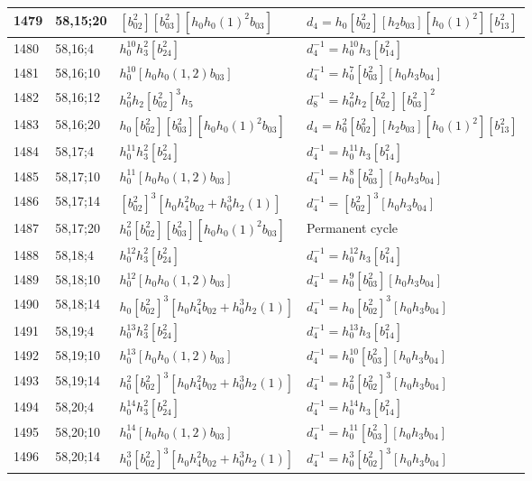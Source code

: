 \documentclass{article}
\begin{document}
\begin{longtable}{|l|l|>{\raggedright\arraybackslash}p{6cm}|>{\raggedright\arraybackslash}p{6cm}|}
\hline
1479 & 58,15;20 & $[b_{02}^2][b_{03}^2][h_0h_0(1)^2b_{03}]$ &$d_{4}=h_0[b_{02}^2][h_2b_{03}][h_0(1)^2][b_{13}^2]$\\
\hline
1480 & 58,16;4 & $h_0^{10}h_3^2[b_{24}^2]$ & $d_{4}^{-1}=h_0^{10}h_3[b_{14}^2]$\\
\hline
1481 & 58,16;10 & $h_0^{10}[h_0h_0(1, 2)b_{03}]$ & $d_{4}^{-1}=h_0^7[b_{03}^2][h_0h_3b_{04}]$\\
\hline
1482 & 58,16;12 & $h_0^2h_2[b_{02}^2]^3h_5$ & $d_{8}^{-1}=h_0^2h_2[b_{02}^2][b_{03}^2]^2$\\
\hline
1483 & 58,16;20 & $h_0[b_{02}^2][b_{03}^2][h_0h_0(1)^2b_{03}]$ &$d_{4}=h_0^2[b_{02}^2][h_2b_{03}][h_0(1)^2][b_{13}^2]$\\
\hline
1484 & 58,17;4 & $h_0^{11}h_3^2[b_{24}^2]$ & $d_{4}^{-1}=h_0^{11}h_3[b_{14}^2]$\\
\hline
1485 & 58,17;10 & $h_0^{11}[h_0h_0(1, 2)b_{03}]$ & $d_{4}^{-1}=h_0^8[b_{03}^2][h_0h_3b_{04}]$\\
\hline
1486 & 58,17;14 & $[b_{02}^2]^3[h_0h_4^2b_{02} + h_0^3h_2(1)]$ & $d_{4}^{-1}=[b_{02}^2]^3[h_0h_3b_{04}]$\\
\hline
1487 & 58,17;20 & $h_0^2[b_{02}^2][b_{03}^2][h_0h_0(1)^2b_{03}]$ & Permanent cycle\\
\hline
1488 & 58,18;4 & $h_0^{12}h_3^2[b_{24}^2]$ & $d_{4}^{-1}=h_0^{12}h_3[b_{14}^2]$\\
\hline
1489 & 58,18;10 & $h_0^{12}[h_0h_0(1, 2)b_{03}]$ & $d_{4}^{-1}=h_0^9[b_{03}^2][h_0h_3b_{04}]$\\
\hline
1490 & 58,18;14 & $h_0[b_{02}^2]^3[h_0h_4^2b_{02} + h_0^3h_2(1)]$ & $d_{4}^{-1}=h_0[b_{02}^2]^3[h_0h_3b_{04}]$\\
\hline
1491 & 58,19;4 & $h_0^{13}h_3^2[b_{24}^2]$ & $d_{4}^{-1}=h_0^{13}h_3[b_{14}^2]$\\
\hline
1492 & 58,19;10 & $h_0^{13}[h_0h_0(1, 2)b_{03}]$ & $d_{4}^{-1}=h_0^{10}[b_{03}^2][h_0h_3b_{04}]$\\
\hline
1493 & 58,19;14 & $h_0^2[b_{02}^2]^3[h_0h_4^2b_{02} + h_0^3h_2(1)]$ & $d_{4}^{-1}=h_0^2[b_{02}^2]^3[h_0h_3b_{04}]$\\
\hline
1494 & 58,20;4 & $h_0^{14}h_3^2[b_{24}^2]$ & $d_{4}^{-1}=h_0^{14}h_3[b_{14}^2]$\\
\hline
1495 & 58,20;10 & $h_0^{14}[h_0h_0(1, 2)b_{03}]$ & $d_{4}^{-1}=h_0^{11}[b_{03}^2][h_0h_3b_{04}]$\\
\hline
1496 & 58,20;14 & $h_0^3[b_{02}^2]^3[h_0h_4^2b_{02} + h_0^3h_2(1)]$ & $d_{4}^{-1}=h_0^3[b_{02}^2]^3[h_0h_3b_{04}]$\\

\end{longtable}
\end{document}
